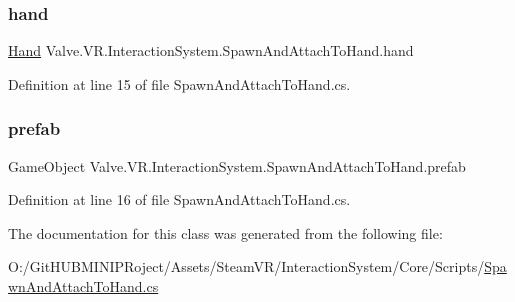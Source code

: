 \subsubsection{\texorpdfstring{hand}{hand}}
{\footnotesize\ttfamily \mbox{\hyperlink{class_valve_1_1_v_r_1_1_interaction_system_1_1_hand}{Hand}} Valve.\+V\+R.\+Interaction\+System.\+Spawn\+And\+Attach\+To\+Hand.\+hand}



Definition at line 15 of file Spawn\+And\+Attach\+To\+Hand.\+cs.

\mbox{\label{class_valve_1_1_v_r_1_1_interaction_system_1_1_spawn_and_attach_to_hand_ae24c05cef1841520e7b839d33afc80aa}} 
\subsubsection{\texorpdfstring{prefab}{prefab}}
{\footnotesize\ttfamily Game\+Object Valve.\+V\+R.\+Interaction\+System.\+Spawn\+And\+Attach\+To\+Hand.\+prefab}



Definition at line 16 of file Spawn\+And\+Attach\+To\+Hand.\+cs.



The documentation for this class was generated from the following file\+:\begin{DoxyCompactItemize}
\item 
O\+:/\+Git\+H\+U\+B\+M\+I\+N\+I\+P\+Roject/\+Assets/\+Steam\+V\+R/\+Interaction\+System/\+Core/\+Scripts/\mbox{\hyperlink{_spawn_and_attach_to_hand_8cs}{Spawn\+And\+Attach\+To\+Hand.\+cs}}\end{DoxyCompactItemize}
